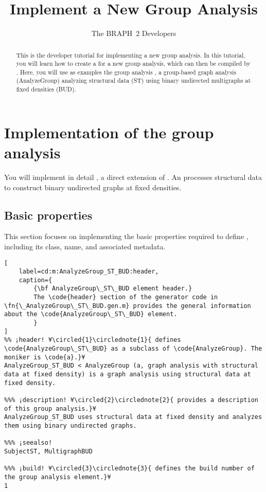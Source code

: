 \documentclass{tufte-handout}
\title{Implement a New Group Analysis}
\author[The BRAPH~2 Developers]{The BRAPH~2 Developers}
\begin{document}
\maketitle

\begin{abstract}
\noindent
This is the developer tutorial for implementing a new group analysis. 
In this tutorial, you will learn how to create a  for a new group analysis, which can then be compiled by .
Here, you will use as examples the group analysis , a group-based graph analysis (AnalyzeGroup) analyzing structural data (ST) using binary undirected multigraphs at fixed densities (BUD).
\end{abstract}

\tableofcontents

\clearpage

\section{Implementation of the group analysis}

You will implement in detail , a direct extension of .
An  processes structural data to construct binary undirected graphs at fixed densities.

\subsection{Basic properties}
This section focuses on implementing the basic properties required to define , including its class, name, and associated metadata.

\begin{lstlisting}[
	label=cd:m:AnalyzeGroup_ST_BUD:header,
	caption={
		{\bf AnalyzeGroup\_ST\_BUD element header.}
		The \code{header} section of the generator code in \fn{\_AnalyzeGroup\_ST\_BUD.gen.m} provides the general information about the \code{AnalyzeGroup\_ST\_BUD} element.
		}
]
%% ¡header! ¥\circled{1}\circlednote{1}{ defines \code{AnalyzeGroup\_ST\_BUD} as a subclass of \code{AnalyzeGroup}. The moniker is \code{a}.}¥
AnalyzeGroup_ST_BUD < AnalyzeGroup (a, graph analysis with structural data at fixed density) is a graph analysis using structural data at fixed density.

%%% ¡description! ¥\circled{2}\circlednote{2}{ provides a description of this group analysis.}¥
AnalyzeGroup_ST_BUD uses structural data at fixed density and analyzes them using binary undirected graphs.

%%% ¡seealso!
SubjectST, MultigraphBUD

%%% ¡build! ¥\circled{3}\circlednote{3}{ defines the build number of the group analysis element.}¥
1
\end{lstlisting}
\end{document}
